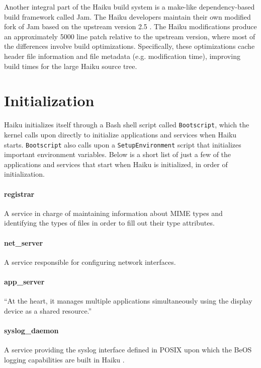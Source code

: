 \documentclass{article}
\begin{document}
Another integral part of the Haiku build system is a make-like
dependency-based build framework called Jam.  The Haiku developers
maintain their own modified fork of Jam based on the upstream version
2.5 \cite{UsingJam}.  The Haiku modifications produce an approximately
5000 line patch relative to the upstream version, where most of the
differences involve build optimizations.  Specifically, these
optimizations cache header file information and file metadata
(e.g. modification time), improving build times for the large Haiku
source tree.

\section{Initialization}

Haiku initializes itself through a Bash shell script
called \texttt{Bootscript}, which the kernel calls upon directly to
initialize applications and services when Haiku
starts. \texttt{Bootscript} also calls upon
a \texttt{SetupEnvironment} script that initializes important
environment variables. Below is a short list of just a few of the
applications and services that start when Haiku is initialized, in
order of initialization.

\paragraph{registrar}
A service in charge of maintaining information about MIME types and
identifying the types of files in order to fill out their type
attributes. \cite{RegistrarInfo}

\paragraph{net\_server}
A service responsible for configuring network
interfaces. \cite{NetServerSource}

\paragraph{app\_server}
``At the heart, it manages multiple applications simultaneously using
the display device as a shared resource.''\cite{AppServer}

\paragraph{syslog\_daemon}
A service providing the syslog interface defined in POSIX upon which
the BeOS logging capabilities are built in Haiku \cite{SyslogInfo}.
\end{document}

